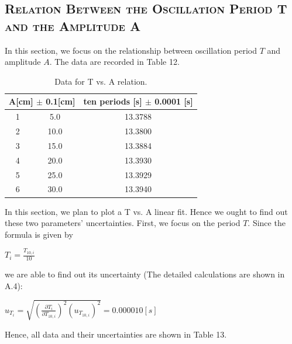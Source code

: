 \documentclass[a4paper,12pt]{article}
\begin{document}
\subsection{\textsc{Relation Between the Oscillation Period T and the Amplitude A}}
In this section, we focus on the relationship between oscillation period $T$ and amplitude $A$. The data are recorded in Table 12.

\begin{table}[h]
\begin{center}
\begin{tabular}{|c|c|c|}
\hline
\multicolumn{2}{|c|}{A[cm] $\pm$ 0.1[cm]} & ten periods [s] $\pm$ 0.0001 [s] \\
\hline
1 & 5.0 & 13.3788 \\
2 & 10.0 & 13.3800 \\
3 & 15.0 & 13.3884 \\
4 & 20.0 & 13.3930 \\
5 & 25.0 & 13.3929 \\
6 & 30.0 & 13.3940 \\
\hline
\end{tabular}
\end{center}
\caption{Data for T vs. A relation.}
\end{table}

\par In this section, we plan to plot a T vs. A linear fit. Hence we ought to find out these two parameters' uncertainties. First, we focus on the period $T$. Since the formula is given by
\begin{center}
$\displaystyle T_i = \frac{T_{10,i}}{10} $
\end{center}
we are able to find out its uncertainty (The detailed calculations are shown in A.4):
\begin{center}
$\displaystyle u_{T_i} = \sqrt{(\frac{\partial T_i}{\partial T_{10,i}})^2(u_{T_{10,i}})^2} = 0.000010 [s]$
\end{center}
\par Hence, all data and their uncertainties are shown in Table 13.
\end{document}
